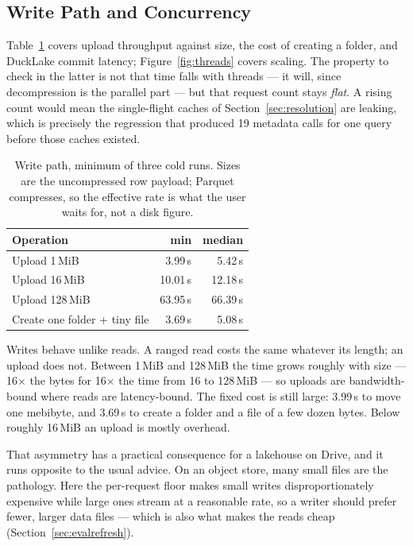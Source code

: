 \documentclass[sigconf, nonacm]{acmart}
\begin{document}
\subsection{Write Path and Concurrency}

Table~\ref{tab:writes} covers upload throughput against size, the cost of
creating a folder, and DuckLake commit latency; Figure~\ref{fig:threads} covers
scaling. The property to check in the latter is not that time falls with
threads --- it will, since decompression is the parallel part --- but that
request count stays \emph{flat}. A rising count would mean the single-flight
caches of Section~\ref{sec:resolution} are leaking, which is precisely the
regression that produced 19 metadata calls for one query before those caches
existed.

\begin{table}[t]
\caption{Write path, minimum of three cold runs. Sizes are the uncompressed
row payload; Parquet compresses, so the effective rate is what the user waits
for, not a disk figure.}
\label{tab:writes}
\small
\begin{tabular}{lrr}
\toprule
Operation & min & median \\
\midrule
Upload 1\,MiB                & 3.99\,s  & 5.42\,s \\
Upload 16\,MiB               & 10.01\,s & 12.18\,s \\
Upload 128\,MiB              & 63.95\,s & 66.39\,s \\
Create one folder + tiny file & 3.69\,s  & 5.08\,s \\
\bottomrule
\end{tabular}
\end{table}

Writes behave unlike reads. A ranged read costs the same whatever its length;
an upload does not. Between 1\,MiB and 128\,MiB the time grows roughly with
size --- 16$\times$ the bytes for 16$\times$ the time from 16 to 128\,MiB ---
so uploads are bandwidth-bound where reads are latency-bound. The fixed cost
is still large: 3.99\,s to move one mebibyte, and 3.69\,s to create a folder
and a file of a few dozen bytes. Below roughly 16\,MiB an upload is mostly
overhead.

That asymmetry has a practical consequence for a lakehouse on Drive, and it
runs opposite to the usual advice. On an object store, many small files are
the pathology. Here the per-request floor makes small writes disproportionately
expensive while large ones stream at a reasonable rate, so a writer should
prefer fewer, larger data files --- which is also what makes the reads cheap
(Section~\ref{sec:evalrefresh}).
\end{document}
